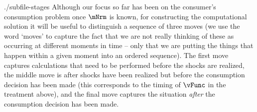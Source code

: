 \documentclass[titlepage, headings=optiontotocandhead]{\econtex}
\providecommand{\move}{move}\renewcommand{\move}{move}
\providecommand{\moves}{moves}\renewcommand{\moves}{moves}
\begin{document}
\unskip
\begin{verbatimwrite}{./subfile-stages}  Although our focus so far has been on the consumer's consumption problem once $\mNrm$ is known, for constructing the computational solution it will be useful to distinguish a sequence of three {\moves} (we use the word `\moves' to capture the fact that we are not really thinking of these as occurring at different moments in time -- only that we are putting the things that happen within a given moment into an ordered sequence).  The first {\move} captures calculations that need to be performed before the shocks are realized, the middle {\move} is after shocks have been realized but before the consumption decision has been made (this corresponds to the timing of $\vFunc$ in the treatment above), and the final {\move} captures the situation \textit{after} the consumption decision has been made.
\end{verbatimwrite}

\end{document}
